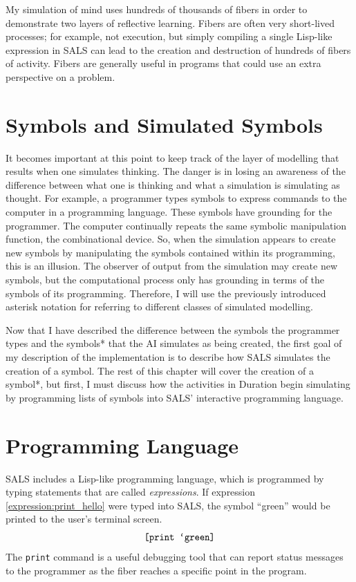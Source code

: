 My simulation of mind uses hundreds of thousands of fibers in order to
demonstrate two layers of reflective learning.  Fibers are often very
short-lived processes; for example, not execution, but simply
compiling a single Lisp-like expression in SALS can lead to the
creation and destruction of hundreds of fibers of activity.  Fibers
are generally useful in programs that could use an extra perspective
on a problem.

\section{Symbols and Simulated Symbols}

It becomes important at this point to keep track of the layer of
modelling that results when one simulates thinking.  The danger is in
losing an awareness of the difference between what one is thinking and
what a simulation is simulating as thought.  For example, a programmer
types symbols to express commands to the computer in a programming
language.  These symbols have grounding for the programmer.  The
computer continually repeats the same symbolic manipulation function,
the combinational device.  So, when the simulation appears to create
new symbols by manipulating the symbols contained within its
programming, this is an illusion.  The observer of output from the
simulation may create new symbols, but the computational process only
has grounding in terms of the symbols of its programming.  Therefore,
I will use the previously introduced asterisk notation for referring
to different classes of simulated modelling.

Now that I have described the difference between the symbols the
programmer types and the symbols* that the AI simulates as being
created, the first goal of my description of the implementation is to
describe how SALS simulates the creation of a symbol.  The rest of
this chapter will cover the creation of a symbol*, but first, I must
discuss how the activities in Duration begin simulating by programming
lists of symbols into SALS' interactive programming language.

\section{Programming Language}

SALS includes a Lisp-like programming language, which is programmed
by typing statements that are called \emph{expressions}.  If
expression \ref{expression:print_hello} were typed into SALS, the
symbol ``green'' would be printed to the user's terminal screen.
\begin{equation}
\label{expression:print_hello}
\text{\tt [print `green]}
\end{equation}
The {\tt print} command is a useful debugging tool that can report
status messages to the programmer as the fiber reaches a specific
point in the program.

